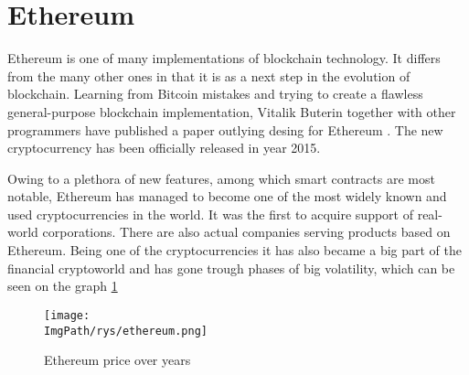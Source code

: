 \documentclass[a4paper,12pt,twoside,openany]{report}
\newcommand{\ImgPath}{.}
\begin{document}
\section{Ethereum}

Ethereum is one of many implementations of blockchain technology. It differs from the many other ones in that it is as a next step in the evolution of blockchain. Learning from Bitcoin mistakes and trying to create a flawless general-purpose blockchain implementation, Vitalik Buterin together with other programmers have published a paper outlying desing for Ethereum \cite{Ethereum}.  The new cryptocurrency has been officially released in year 2015. 

Owing to a plethora of new features, among which smart contracts are most notable, Ethereum has managed to become one of the most widely known and used cryptocurrencies in the world. It was the first to acquire support of real-world corporations. There are also actual companies serving products based on Ethereum. Being one of the cryptocurrencies it has also became a big part of the financial cryptoworld and has gone trough phases of big volatility, which can be seen on the graph \ref{ethereum}

\begin{figure}[!htbp]
	\begin{center}
\centering
\texttt{[image: \\ImgPath/rys/ethereum.png]}
\end{center}
	\caption{Ethereum price over years}
	\label{ethereum}
\end{figure}
\end{document}
